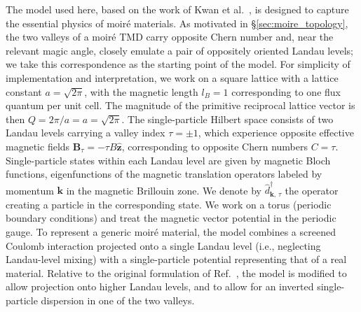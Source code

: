 The model used here, based on the work of Kwan et al.~\cite{kwan2025textured}, is designed to capture the essential physics of moir\'e materials. As motivated in \S\ref{sec:moire_topology}, the two valleys of a moir\'e TMD carry opposite Chern number and, near the relevant magic angle, closely emulate a pair of oppositely oriented Landau levels; we take this correspondence as the starting point of the model. For simplicity of implementation and interpretation, we work on a square lattice with a lattice constant $a = \sqrt{2\pi}$, with the magnetic length $l_B = 1$ corresponding to one flux quantum per unit cell. The magnitude of the primitive reciprocal lattice vector is then $Q = 2\pi/a = a = \sqrt{2\pi}$. The single-particle Hilbert space consists of two Landau levels carrying a valley index $\tau = \pm 1$, which experience opposite effective magnetic fields $\mathbf{B}_\tau = - \tau B \hat{\mathbf{z}}$, corresponding to opposite Chern numbers $C = \tau$. Single-particle states within each Landau level are given by magnetic Bloch functions, eigenfunctions of the magnetic translation operators labeled by momentum $\mathbf{k}$ in the magnetic Brillouin zone. We denote by $\hat{d}_{\mathbf{k},\,\tau}^\dagger$ the operator creating a particle in the corresponding state. We work on a torus (periodic boundary conditions) and treat the magnetic vector potential in the periodic gauge.  To represent a generic moir\'e material, the model combines a screened Coulomb interaction projected onto a single Landau level (i.e., neglecting Landau-level mixing) with a single-particle potential representing that of a real material. Relative to the original formulation of Ref.~\cite{kwan2025textured}, the model is modified to allow projection onto higher Landau levels, and to allow for an inverted single-particle dispersion in one of the two valleys.


